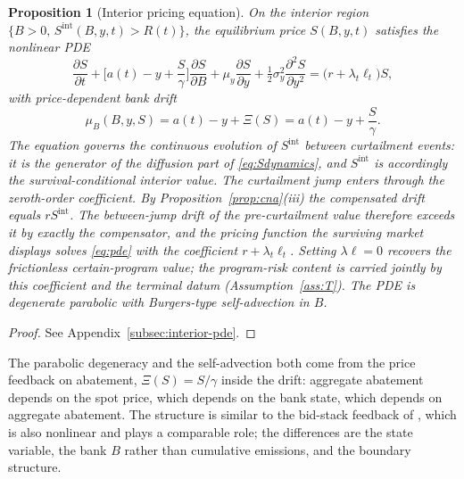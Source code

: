 \documentclass[11pt,letterpaper]{article}
\theoremstyle{plain}
\newtheorem{proposition}[theorem]{Proposition}
\theoremstyle{definition}
\numberwithin{equation}{section}
\begin{document}
\begin{proposition}[Interior pricing equation]\label{prop:intpricing}
On the interior region $\{B>0,\, S^{\mathrm{int}}(B,y,t) > R(t)\}$, the equilibrium price $S(B,y,t)$ satisfies the nonlinear PDE
\begin{equation}\label{eq:pde}
  \frac{\partial S}{\partial t} + \bigl[a(t)-y+\frac{S}{\gamma}\bigr]\frac{\partial S}{\partial B}
  + \mu_y\frac{\partial S}{\partial y}
  + \tfrac{1}{2}\sigma_y^2\frac{\partial^2 S}{\partial y^2} = \bigl(r+\lambda_t\ell_t\bigr)S,
\end{equation}
with price-dependent bank drift
\begin{equation}\label{eq:bdrift}
  \mu_B(B,y,S) = a(t) - y + \Xi(S) = a(t) - y + \frac{S}{\gamma}.
\end{equation}
The equation governs the continuous evolution of $S^{\mathrm{int}}$ between curtailment events: it is the generator of the diffusion part of \eqref{eq:Sdynamics}, and $S^{\mathrm{int}}$ is accordingly the survival-conditional interior value. The curtailment jump enters through the zeroth-order coefficient. By Proposition~\ref{prop:cna}(iii) the compensated drift equals $rS^{\mathrm{int}}$. The between-jump drift of the pre-curtailment value therefore exceeds it by exactly the compensator, and the pricing function the surviving market displays solves \eqref{eq:pde} with the coefficient $r+\lambda_t\ell_t$. Setting $\lambda\ell=0$ recovers the frictionless certain-program value; the program-risk content is carried jointly by this coefficient and the terminal datum (Assumption~\ref{ass:T}). The PDE is degenerate parabolic with Burgers-type self-advection in $B$.
\end{proposition}

\begin{proof}
See Appendix~\ref{subsec:interior-pde}.
\end{proof}

The parabolic degeneracy and the self-advection both come from the price feedback on abatement, $\Xi(S)=S/\gamma$ inside the drift: aggregate abatement depends on the spot price, which depends on the bank state, which depends on aggregate abatement. The structure is similar to the bid-stack feedback of \citet{howison2012}, which is also nonlinear and plays a comparable role; the differences are the state variable, the bank $B$ rather than cumulative emissions, and the boundary structure.
\end{document}
